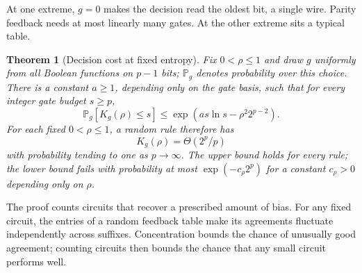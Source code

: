 \documentclass[11pt,a4paper]{article}
\newtheorem{theorem}{Theorem}
\newcommand{\PP}{\mathbb{P}}
\begin{document}
At one extreme, \(g=0\) makes the decision read the oldest bit, a single wire. Parity feedback needs at most linearly many gates. At the other extreme sits a typical table.

\begin{theorem}[Decision cost at fixed entropy]
\label{thm:hardness}
Fix \(0<\rho\le1\) and draw \(g\) uniformly from all Boolean functions on \(p-1\) bits; \(\PP_g\) denotes probability over this choice. There is a constant \(a\ge1\), depending only on the gate basis, such that for every integer gate budget \(s\ge p\),
\begin{equation}
\PP_g[K_g(\rho)\le s]
\le\exp\!\left(a s\ln s-\rho^2 2^{p-2}\right).
\label{eq:counting-bound}
\end{equation}
For each fixed \(0<\rho\le1\), a random rule therefore has
\begin{equation}
K_g(\rho)=\Theta(2^p/p)
\label{eq:exponential-cost}
\end{equation}
with probability tending to one as \(p\to\infty\). The upper bound holds for every rule; the lower bound fails with probability at most \(\exp(-c_\rho2^p)\) for a constant \(c_\rho>0\) depending only on \(\rho\).
\end{theorem}

The proof counts circuits that recover a prescribed amount of bias. For any fixed circuit, the entries of a random feedback table make its agreements fluctuate independently across suffixes. Concentration bounds the chance of unusually good agreement; counting circuits then bounds the chance that any small circuit performs well.
\end{document}
